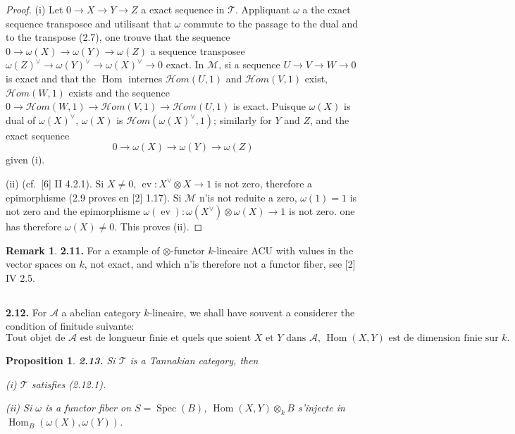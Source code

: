\documentclass[12pt,a4paper]{article}
\theoremstyle{plain}
\newtheorem{proposition}[theorem]{Proposition}
\theoremstyle{definition}
\newtheorem{remark}[theorem]{Remark}
\theoremstyle{remark}
\DeclareMathOperator{\Hom}{Hom}
\DeclareMathOperator{\Spec}{Spec}
\DeclareMathOperator{\ev}{ev}
\begin{document}
\begin{proof}
(i) Let $0 \to X \to Y \to Z$ a exact sequence in $\mathcal{T}$. Appliquant $\omega$ a the exact sequence transposee and utilisant that $\omega$ commute to the passage to the dual and to the transpose (2.7), one trouve that the sequence $0 \to \omega(X) \to \omega(Y) \to \omega(Z)$ a sequence transposee $\omega(Z)^\vee \to \omega(Y)^\vee \to \omega(X)^\vee \to 0$ exact. In $\mathcal{M}$, si a sequence $U \to V \to W \to 0$ is exact and that the $\Hom$ internes $\mathcal{H}om(U,1)$ and $\mathcal{H}om(V,1)$ exist, $\mathcal{H}om(W,1)$ exists and the sequence $0 \to \mathcal{H}om(W,1) \to \mathcal{H}om(V,1) \to \mathcal{H}om(U,1)$ is exact. Puisque $\omega(X)$ is dual of $\omega(X)^\vee$, $\omega(X)$ is $\mathcal{H}om(\omega(X)^\vee, 1)$; similarly for $Y$ and $Z$, and the exact sequence
\[
0 \to \omega(X) \to \omega(Y) \to \omega(Z)
\]
given (i).

(ii) (cf.~[6] II 4.2.1). Si $X \neq 0$, $\ev : X^\vee \otimes X \to 1$ is not zero, therefore a epimorphisme (2.9 proves en [2] 1.17). Si $\mathcal{M}$ n'is not reduite a zero, $\omega(1) = 1$ is not zero and the epimorphisme $\omega(\ev) : \omega(X^\vee) \otimes \omega(X) \to 1$ is not zero. one has therefore $\omega(X) \neq 0$. This proves (ii).
\end{proof}

\begin{remark}
\textbf{2.11.} For a example of $\otimes$-functor $k$-lineaire ACU with values in the vector spaces on $k$, not exact, and which n'is therefore not a functor fiber, see [2] IV 2.5.
\end{remark}

\subsection{}

\textbf{2.12.} For $\mathcal{A}$ a abelian category $k$-lineaire, we shall have souvent a considerer the condition of finitude suivante:
\begin{equation}\label{eq:2.12.1}
\text{Tout objet de $\mathcal{A}$ est de longueur finie et quels que soient $X$ et $Y$ dans $\mathcal{A}$, $\Hom(X,Y)$ est de dimension finie sur $k$.}
\end{equation}

\begin{proposition}\label{prop:2.13}
\textbf{2.13.} Si $\mathcal{T}$ is a Tannakian category, then

\emph{(i)} $\mathcal{T}$ satisfies (2.12.1).

\emph{(ii)} Si $\omega$ is a functor fiber on $S = \Spec(B)$, $\Hom(X,Y) \otimes_k B$ s'injecte in $\Hom_B(\omega(X), \omega(Y))$.
\end{proposition}
\end{document}
